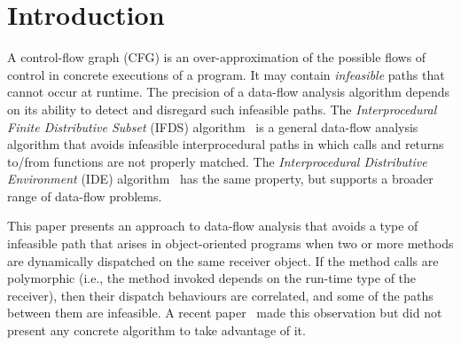 \section{Introduction}


A control-flow graph (CFG) is an over-approximation of the possible flows 
of control in concrete executions of a program. It may contain \textit{infeasible} 
paths that cannot occur at runtime. The precision of a data-flow analysis algorithm
depends on its ability to detect and disregard such infeasible paths.
The \textit{Interprocedural Finite Distributive Subset} (IFDS) algorithm~\cite{reps1995precise}
is a general data-flow analysis algorithm that 
avoids infeasible interprocedural paths in which calls 
and returns to/from functions are not properly matched. %
The \textit{Interprocedural Distributive Environment} (IDE) algorithm~\cite{sagiv1996precise}
has the same property, but
supports a broader range of data-flow problems.

This paper presents an approach to data-flow analysis that avoids a type
of infeasible path that arises in object-oriented programs when two or more
methods are dynamically dispatched on the same receiver object.
If the
method calls are polymorphic
(i.e., the method invoked depends on the run-time type of the receiver),
then their dispatch 
behaviours are correlated, and some of the paths between them are infeasible. A recent paper~\cite{DBLP:journals/scp/Tip15} made this observation
but did not present any concrete algorithm to take advantage of it.

